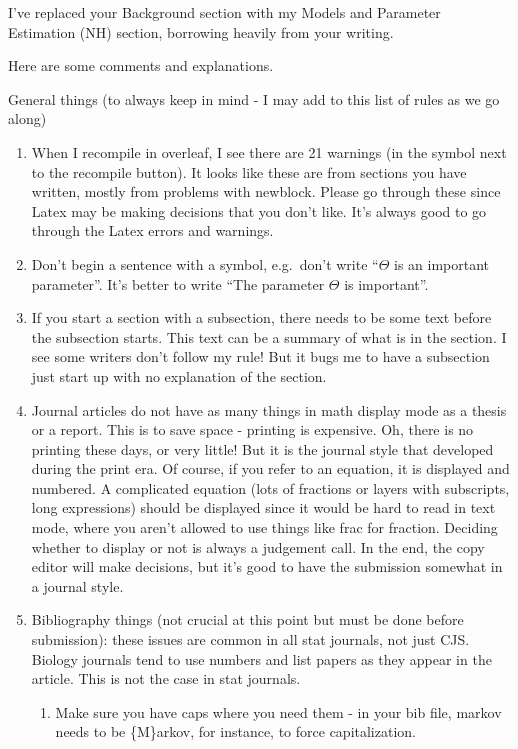 
I've replaced your Background section with my Models and Parameter Estimation (NH) section, borrowing heavily from your writing.

Here are some comments and explanations.  

General things (to always keep in mind - I may add to this list of rules as we go along)
\begin{enumerate}
\item When I recompile in overleaf, I see there are 21 warnings (in the symbol next to the recompile button).  It looks like these are from sections you have written, mostly from problems with newblock.  Please go through these since Latex may be making decisions that you don't like.  It's always good to go through the Latex errors and warnings. 
    \item Don't begin a sentence with a symbol, e.g.~don't write ``$\Theta$ is an important parameter''. 
    It's better to write ``The parameter $\Theta$ is important''.
    \item If you start a section with a subsection, there needs to be some text before the subsection starts.  This text can be a summary of what is in the section.  I see some writers don't follow my rule!  But it bugs me to have a subsection just start up with no explanation of the section.
    \item  Journal articles do not have as many things in math display mode as a thesis or a report.  This is to save space - printing is expensive.  Oh, there is no printing these days, or very little!  But it is the journal style that developed during the print era.  Of course, if you refer to an equation, it is displayed and numbered. A complicated equation (lots of fractions or layers with subscripts, long expressions) should be displayed since it would be hard to read in text mode, where you aren't allowed to use things like frac for fraction. 
    Deciding whether to display or not is always a judgement call.
    In the end, the copy editor will make decisions, but it's good to have the submission somewhat in a journal style.  
    \item Bibliography things (not crucial at this point but must be done before submission):  these issues are common in all stat journals, not just CJS.  Biology journals tend to use numbers and list papers as they appear in the article.  This is not the case in stat journals.
    \begin{enumerate}
        \item 
    Make sure you have caps where you need them - in your bib file,  markov needs to be \{M\}arkov, for instance, to force capitalization.

\end{enumerate}
\end{enumerate}
